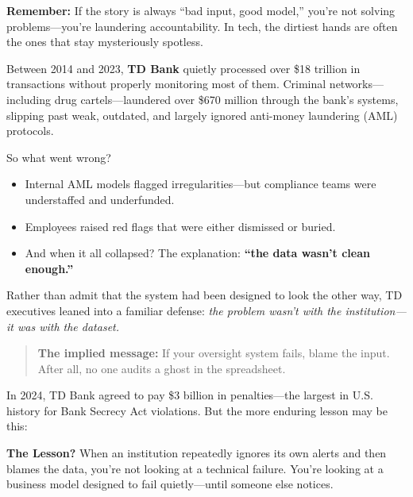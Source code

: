 \medskip

\textbf{Remember:} If the story is always “bad input, good model,” you’re not solving problems—you’re laundering accountability.  
In tech, the dirtiest hands are often the ones that stay mysteriously spotless.




\begin{tcolorbox}[colback=blue!5!white, colframe=blue!50!black,
  title={Historical Sidebar: TD Bank — When “Bad Data” Became the Fall Guy for \$18 Trillion}]

Between 2014 and 2023, \textbf{TD Bank} quietly processed over \$18 trillion in transactions without properly monitoring most of them.  
Criminal networks—including drug cartels—laundered over \$670 million through the bank’s systems, slipping past weak, outdated, and largely ignored anti-money laundering (AML) protocols.

\medskip

So what went wrong?

\begin{itemize}
  \item Internal AML models flagged irregularities—but compliance teams were understaffed and underfunded.
  \item Employees raised red flags that were either dismissed or buried.
  \item And when it all collapsed? The explanation: \textbf{“the data wasn’t clean enough.”}
\end{itemize}

\medskip

Rather than admit that the system had been designed to look the other way, TD executives leaned into a familiar defense:  
\textit{the problem wasn’t with the institution—it was with the dataset.}

\medskip

\begin{quote}
\textbf{The implied message:} If your oversight system fails, blame the input. After all, no one audits a ghost in the spreadsheet.
\end{quote}

\medskip

In 2024, TD Bank agreed to pay \$3 billion in penalties—the largest in U.S. history for Bank Secrecy Act violations.  
But the more enduring lesson may be this:

\medskip

\textbf{The Lesson?} When an institution repeatedly ignores its own alerts and then blames the data, you’re not looking at a technical failure.  
You’re looking at a business model designed to fail quietly—until someone else notices.

\end{tcolorbox}


